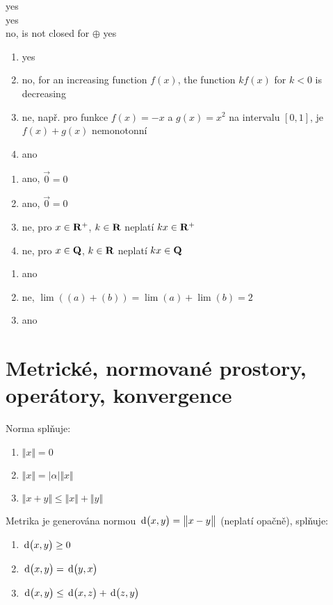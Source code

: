 \documentclass[a4paper,10pt]{book}
\def\Real{{\rm\bf R}}
\def\d{\,{\rm d}}               %
\def\abs#1{\lvert#1\rvert}
\def\norm#1{\bigl\Vert#1\bigr\Vert} %
\def\metr#1#2{\d\bigl(#1,#2\bigr)}          %
\begin{document}
 yes   \\
 yes   \\
 no, is not closed for $\oplus$ 
 yes   \\
  \begin{enumerate}[label=\alph*), itemsep=-5pt, topsep=-7pt]
    \item yes
    \item no, for an increasing function $f(x)$, the function $kf(x)$ for $k<0$ is decreasing
    \item ne, např. pro funkce $f(x)=-x$ a $g(x)=x^2$ na intervalu $[0,1]$, je $f(x)+g(x)$   
          nemonotonní
    \item ano
  \end{enumerate}
  \begin{enumerate}[label=\alph*), itemsep=-5pt, topsep=-7pt]
    \item ano, $\vec{0}=0$
    \item ano, $\vec{0}=0$
    \item ne, pro $x\in\Real^{+}$, $k\in\Real$ neplatí $kx\in\Real^{+}$
    \item ne, pro $x\in\rm\bf{Q}$, $k\in\Real$ neplatí $kx\in\rm\bf{Q}$
  \end{enumerate}
  \begin{enumerate}[label=\alph*), itemsep=-5pt, topsep=-7pt]
    \item ano    
    \item ne, $\lim\left((a)+(b)\right) = \lim (a) + \lim(b) = 2$
    \item ano
  \end{enumerate}



\chapter{Metrické, normované prostory, operátory, konvergence}
Norma splňuje:
\begin{enumerate}[label=N\arabic*, itemsep=-3pt, topsep=-7pt]
\item $\norm{x}=0$ \label{norm1}
\item $\norm{x}=\abs{\alpha}\norm{x}$ \label{norm2}
\item $\norm{x+y}\leq \norm{x} + \norm{y}$ \label{norm3}
\end{enumerate}

Metrika je generována normou $\metr{x}{y} = \norm{x-y}$ (neplatí opačně), splňuje:
\begin{enumerate}[label=M\arabic*, itemsep=-3pt, topsep=-7pt]
\item $\metr{x}{y} \geq 0$
\item $\metr{x}{y} = \metr{y}{x}$
\item $\metr{x}{y}\leq \metr{x}{z} + \metr{z}{y}$
\end{enumerate}
\end{document}
